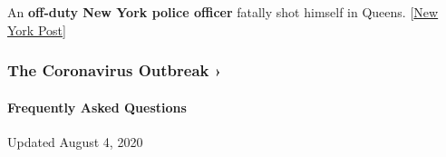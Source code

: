 An \textbf{off-duty New York police officer} fatally shot himself in
Queens.
{[}\href{https://nypost.com/2020/08/02/off-duty-nypd-cop-shoots-himself-in-the-head-in-queens-suicide/}{New
York Post}{]}

\href{https://www.nytimes.com/news-event/coronavirus?action=click\&pgtype=Article\&state=default\&region=MAIN_CONTENT_3\&context=storylines_faq}{}

\hypertarget{the-coronavirus-outbreak-}{%
\subsubsection{The Coronavirus Outbreak
›}\label{the-coronavirus-outbreak-}}

\hypertarget{frequently-asked-questions}{%
\paragraph{Frequently Asked
Questions}\label{frequently-asked-questions}}

Updated August 4, 2020

